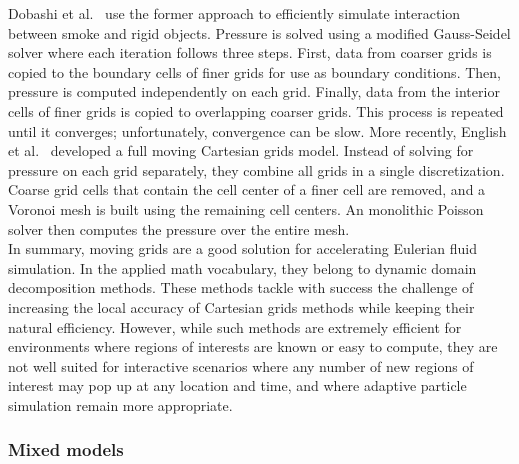 Dobashi et al.~\cite{Dobashi2008:adaptiveGrid} use the former approach to efficiently simulate interaction between smoke and rigid objects. Pressure is solved using a modified Gauss-Seidel solver where each iteration follows three steps.
First, data from coarser grids is copied to the boundary cells of finer grids for use as boundary conditions.
Then, pressure is computed independently on each grid.
Finally, data from the interior cells of finer grids is copied to overlapping coarser grids.
This process is repeated until it converges; unfortunately, convergence can be slow.
More recently, English et al.~\cite{English2013} developed a full moving Cartesian grids model.
Instead of solving for pressure on each grid separately, they combine all grids in a single discretization.
Coarse grid cells that contain the cell center of a finer cell are removed, and a Voronoi mesh is built using the remaining cell centers.
An monolithic Poisson solver then computes the pressure over the entire mesh.
\\
In summary, moving grids are a good solution for accelerating Eulerian fluid simulation. In the applied math vocabulary, they belong to dynamic domain decomposition methods.
These methods tackle with success the challenge of increasing the local accuracy of Cartesian grids methods while keeping their natural efficiency. However, while such methods are extremely efficient for environments where regions of interests are known or easy to compute, they are not well suited for interactive scenarios where any number of new regions of interest may pop up at any location and time, and where adaptive particle simulation remain more appropriate.

\subsubsection{Mixed models}
\label{sec:mixed-models}

